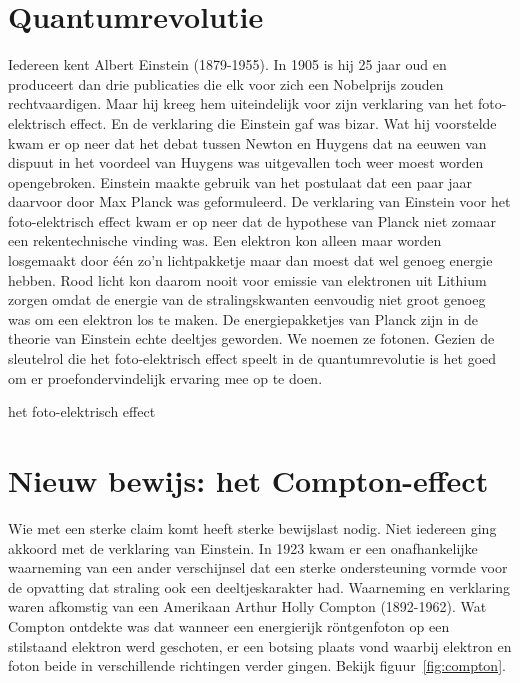 \documentclass[../main.tex]{subfiles}
\begin{document}
\section{Quantumrevolutie}
Iedereen kent Albert Einstein (1879-1955). In 1905 is hij 25 jaar oud en produceert dan drie publicaties die elk voor zich een Nobelprijs zouden rechtvaardigen. Maar hij kreeg hem uiteindelijk voor zijn verklaring van het foto-elektrisch effect. En de verklaring die Einstein gaf was bizar. Wat hij voorstelde kwam er op neer dat het debat tussen Newton en Huygens dat na eeuwen van dispuut in het voordeel van Huygens was uitgevallen toch weer moest worden opengebroken. Einstein maakte gebruik van het postulaat dat een paar jaar daarvoor door Max Planck was geformuleerd. De verklaring van Einstein voor het foto-elektrisch effect kwam er op neer dat de hypothese van Planck niet zomaar een rekentechnische vinding was. Een elektron kon alleen maar worden losgemaakt door \'e\'en zo'n lichtpakketje maar dan moest dat wel genoeg energie hebben. Rood licht kon daarom nooit voor emissie van elektronen uit Lithium zorgen omdat de energie van de stralingskwanten eenvoudig niet groot genoeg was om een elektron los te maken. 
De energiepakketjes van Planck zijn in de theorie van Einstein echte deeltjes geworden. We noemen ze fotonen.
Gezien de sleutelrol die het foto-elektrisch effect speelt in de quantumrevolutie is het goed om er proefondervindelijk ervaring mee op te doen.

\begin{experiment}{het foto-elektrisch effect}
\end{experiment}



\section{Nieuw bewijs: het Compton-effect}
Wie met een sterke claim komt heeft sterke bewijslast nodig. Niet iedereen ging akkoord met de verklaring van Einstein. In 1923 kwam er een onafhankelijke waarneming van een ander verschijnsel dat een sterke ondersteuning vormde voor de opvatting dat straling ook een deeltjeskarakter had. Waarneming en verklaring waren afkomstig van een Amerikaan Arthur Holly Compton (1892-1962). Wat Compton ontdekte was dat wanneer een energierijk r\"ontgenfoton op een stilstaand elektron werd geschoten, er een botsing plaats vond waarbij elektron en foton beide in verschillende richtingen verder gingen. Bekijk figuur~\ref{fig:compton}.
\end{document}
